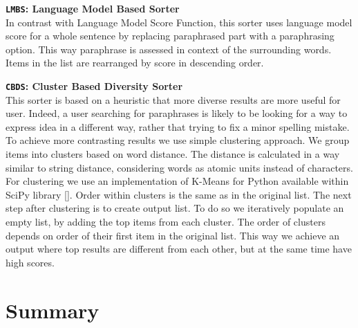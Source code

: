\begin{flushleft}

\textbf{\texttt{LMBS}: \textbf{Language Model Based Sorter}} \\
In contrast with Language Model Score Function, this sorter uses language model score for a whole sentence by replacing paraphrased part with a paraphrasing option. This way paraphrase is assessed in context of the surrounding words. Items in the list are rearranged by score in descending order. 
\bigskip

\textbf{\texttt{CBDS}: \textbf{Cluster Based Diversity Sorter}} \\
This sorter is based on a heuristic that more diverse results are more useful for user. Indeed, a user searching for paraphrases is likely to be looking for a way to express idea in a different way, rather that trying to fix a minor spelling mistake. To achieve more contrasting results we use simple clustering approach. We group items into clusters based on word distance. The distance is calculated in a way similar to string distance, considering words as atomic units instead of characters. For clustering we use an implementation of K-Means for Python available within SciPy library []. Order within clusters is the same as in the original list. The next step after clustering is to create output list. To do so we iteratively populate an empty list, by adding the top items from each cluster. The order of clusters depends on order of their first item in the original list. This way we achieve an output where top results are different from each other, but at the same time have high scores.
\bigskip

\end{flushleft}

\section{Summary}


